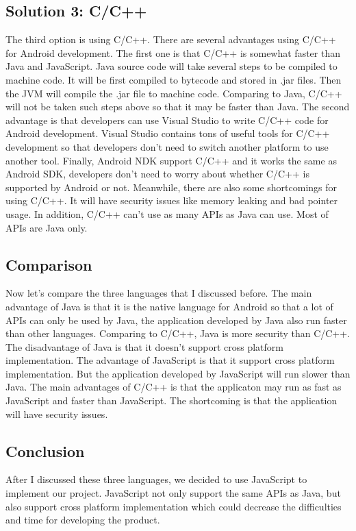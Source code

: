 \documentclass[letterpaper, 10pt,titlepage]{article}
\begin{document}
\subsection{Solution 3: C/C++}
The third option is using C/C++. There are several advantages using C/C++ for Android development. The first one is that C/C++ is somewhat faster than Java and JavaScript. Java source code will take several steps to be compiled to machine code. It will be first compiled to bytecode and stored in .jar files. Then the JVM will compile the .jar file to machine code. Comparing to Java, C/C++ will not be taken such steps above so that it may be faster than Java. The second advantage is that developers can use Visual Studio to write C/C++ code for Android development. Visual Studio contains tons of useful tools for C/C++ development so that developers don’t need to switch another platform to use another tool. Finally, Android NDK support C/C++ and it works the same as Android SDK, developers don’t need to worry about whether C/C++ is supported by Android or not. Meanwhile, there are also some shortcomings for using C/C++. It will have security issues like memory leaking and bad pointer usage. In addition, C/C++ can’t use as many APIs as Java can use. Most of APIs are Java only.\cite{c++}\\

\subsection{Comparison}
Now let's compare the three languages that I discussed before. The main advantage of Java is that it is the native language for Android so that a lot of APIs can only be used by Java, the application developed by Java also run faster than other languages. Comparing to C/C++, Java is more security than C/C++. The disadvantage of Java is that it doesn't support cross platform implementation. The advantage of JavaScript is that it support cross platform implementation. But the application developed by JavaScript will run slower than Java. The main advantages of C/C++ is that the applicaton may run as fast as JavaScript and faster than JavaScript. The shortcoming is that the application will have security issues.\\

\subsection{Conclusion}
After I discussed these three languages, we decided to use JavaScript to implement our project. JavaScript not only support the same APIs as Java, but also support cross platform implementation which could decrease the difficulties and time for developing the product.\\
\end{document}
